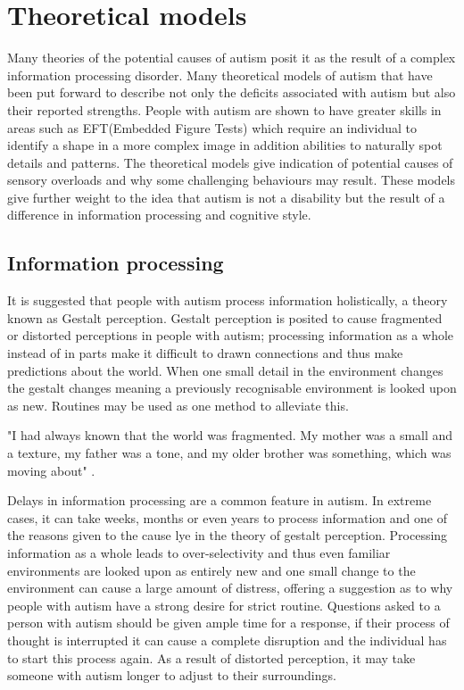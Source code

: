 \documentclass[11pt]{report}
\begin{document}
\section{Theoretical models}
Many theories of the potential causes of autism posit it as the result of a complex information processing disorder\cite{minshewmodel}. Many theoretical models of autism that have been put forward to describe not only the deficits associated with autism but also their reported strengths. People with autism are shown to have greater skills in areas such as EFT(Embedded Figure Tests) which require an individual to identify a shape in a more complex image in addition abilities to naturally spot details and patterns. The theoretical models give indication of potential causes of sensory overloads and why some challenging behaviours may result. These models give further weight to the idea that autism is not a disability but the result of a difference in information processing and cognitive style. 

\subsection{Information processing}

It is suggested that people with autism process information holistically, a theory known as Gestalt perception. Gestalt perception is posited to cause fragmented or distorted perceptions in people with autism\cite{olgab}; processing information as a whole instead of in parts make it difficult to drawn connections and thus make predictions about the world. When one small detail in the environment changes the gestalt changes meaning a previously recognisable environment is looked upon as new. Routines may be used as one method to alleviate this.

"I had always known that the world was fragmented. My mother was a small and a texture, my father was a tone, and my older brother was something, which was moving about" \cite{williams1992}. 

Delays in information processing are a common feature in autism. In extreme cases, it can take weeks, months or even years to process information and one of the reasons given to the cause lye in the theory of gestalt perception. Processing information as a whole leads to over-selectivity and thus even familiar environments are looked upon as entirely new and one small change to the environment can cause a large amount of distress\cite{olgab}, offering a suggestion as to why people with autism have a strong desire for strict routine. Questions asked to a person with autism should be given ample time for a response, if their process of thought is interrupted it can cause a complete disruption and the individual has to start this process again\cite{olgab}. As a result of distorted perception, it may take someone with autism longer to adjust to their surroundings.
\end{document}
